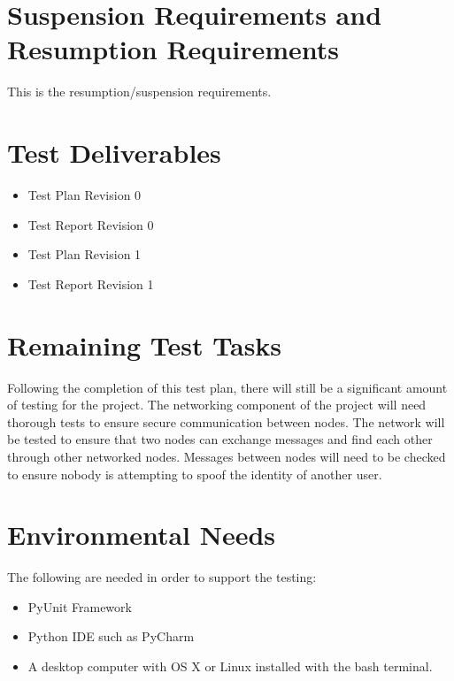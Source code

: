 \documentclass{article}
\begin{document}
\section*{Suspension Requirements and Resumption Requirements}
This is the resumption/suspension requirements.

\section*{Test Deliverables}
\begin{itemize}
 \item
Test Plan Revision 0
 \item
Test Report Revision 0
 \item
Test Plan Revision 1
 \item
Test Report Revision 1
\end{itemize}

\section*{Remaining Test Tasks}
Following the completion of this test plan, there will still be a significant amount of testing for the project. The networking component of the project will need thorough tests to ensure secure communication between nodes. The network will be tested to ensure that two nodes can exchange messages and find each other through other networked nodes. Messages between nodes will need to be checked to ensure nobody is attempting to spoof the identity of another user. 

\section*{Environmental Needs}
The following are needed in order to support the testing:
\newline
\begin{itemize}
 \item
PyUnit Framework
 \item
Python IDE such as PyCharm
 \item
A desktop computer with OS X or Linux installed with the bash terminal.
\end{itemize}

\end{document}
